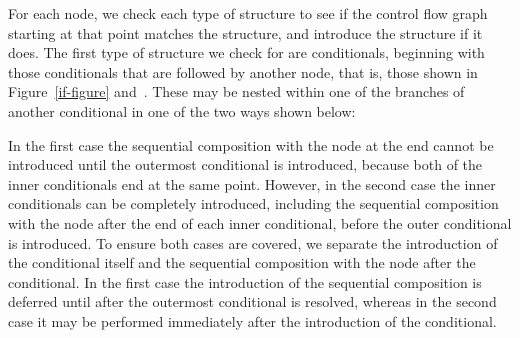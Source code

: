 For each node, we check each type of structure to see if the control
flow graph starting at that point matches the structure, and introduce
the structure if it does.
The first type of structure we check for are conditionals, beginning
with those conditionals that are followed by another node, that is,
those shown in Figure~\ref{if-figure} and~.
These may be nested within one of the branches of another conditional
in one of the two ways shown below:
\begin{center}
  \hfill
\end{center}
In the first case the sequential composition with the node at the end
cannot be introduced until the outermost conditional is introduced,
because both of the inner conditionals end at the same point.
However, in the second case the inner conditionals can be completely
introduced, including the sequential composition with the node after
the end of each inner conditional, before the outer conditional is
introduced.
To ensure both cases are covered, we separate the introduction of the
conditional itself and the sequential composition with the node after
the conditional. 
In the first case the introduction of the sequential composition is
deferred until after the outermost conditional is resolved, whereas in
the second case it may be performed immediately after the introduction
of the conditional.

